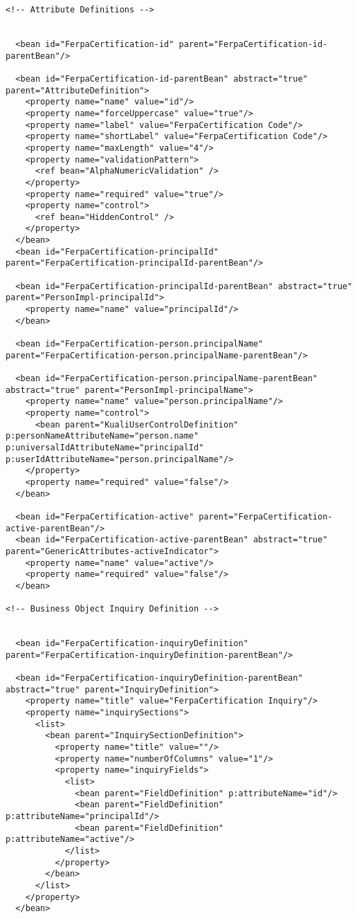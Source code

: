 \begin{verbatim}
<!-- Attribute Definitions -->


  <bean id="FerpaCertification-id" parent="FerpaCertification-id-parentBean"/>

  <bean id="FerpaCertification-id-parentBean" abstract="true" parent="AttributeDefinition">
    <property name="name" value="id"/>
    <property name="forceUppercase" value="true"/>
    <property name="label" value="FerpaCertification Code"/>
    <property name="shortLabel" value="FerpaCertification Code"/>
    <property name="maxLength" value="4"/>
    <property name="validationPattern">
      <ref bean="AlphaNumericValidation" />
    </property>
    <property name="required" value="true"/>
    <property name="control">
      <ref bean="HiddenControl" />
    </property>
  </bean>
  <bean id="FerpaCertification-principalId" parent="FerpaCertification-principalId-parentBean"/>

  <bean id="FerpaCertification-principalId-parentBean" abstract="true" parent="PersonImpl-principalId">
    <property name="name" value="principalId"/>
  </bean>

  <bean id="FerpaCertification-person.principalName" parent="FerpaCertification-person.principalName-parentBean"/>

  <bean id="FerpaCertification-person.principalName-parentBean" abstract="true" parent="PersonImpl-principalName">
    <property name="name" value="person.principalName"/>
    <property name="control">
      <bean parent="KualiUserControlDefinition" p:personNameAttributeName="person.name" p:universalIdAttributeName="principalId" p:userIdAttributeName="person.principalName"/>
    </property>
    <property name="required" value="false"/>
  </bean>

  <bean id="FerpaCertification-active" parent="FerpaCertification-active-parentBean"/>      
  <bean id="FerpaCertification-active-parentBean" abstract="true" parent="GenericAttributes-activeIndicator">
    <property name="name" value="active"/>
    <property name="required" value="false"/>
  </bean>
  
<!-- Business Object Inquiry Definition -->


  <bean id="FerpaCertification-inquiryDefinition" parent="FerpaCertification-inquiryDefinition-parentBean"/>

  <bean id="FerpaCertification-inquiryDefinition-parentBean" abstract="true" parent="InquiryDefinition">
    <property name="title" value="FerpaCertification Inquiry"/>
    <property name="inquirySections">
      <list>
        <bean parent="InquirySectionDefinition">
          <property name="title" value=""/>
          <property name="numberOfColumns" value="1"/>
          <property name="inquiryFields">
            <list>
              <bean parent="FieldDefinition" p:attributeName="id"/>
              <bean parent="FieldDefinition" p:attributeName="principalId"/>
              <bean parent="FieldDefinition" p:attributeName="active"/>
            </list>
          </property>
        </bean>
      </list>
    </property>
  </bean>
  

\end{verbatim}
